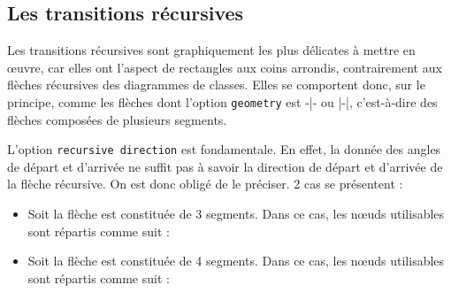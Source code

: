 \documentclass[a4paper,11pt]{report}
\newcommand{\inputTikZ}[1]{%
  }%
\newcommand{\inputTikZ}[1]{%
    \texttt{[image: fig/\#1.pdf]}%
  }%
\begin{document}
\subsection{Les transitions récursives}\label{s.rectrans}

Les transitions récursives sont graphiquement les plus délicates à mettre en \oe{}uvre, car elles ont l'aspect de rectangles aux coins arrondis, contrairement aux flèches récursives des diagrammes de classes. Elles se comportent donc, sur le principe, comme les flèches dont l'option {\tt geometry} est -|- ou |-|, c'est-à-dire des flèches composées de plusieurs segments.

\medskip

\begin{minipage}{0.51\textwidth}

\end{minipage}
\begin{minipage}{0.49\textwidth}
\begin{center}
\inputTikZ{figure56}
\end{center}
\end{minipage}

\medskip

L'option {\tt recursive direction} est fondamentale. En effet, la donnée des angles de départ et d'arrivée ne suffit pas à savoir la direction de départ et d'arrivée de la flèche récursive. On est donc obligé de le préciser. 2 cas se présentent :

\medskip

\begin{itemize}
\item Soit la flèche est constituée de 3 segments. Dans ce cas, les n\oe{}uds utilisables sont répartis comme suit :

\begin{center}
\inputTikZ{figure57}
\end{center}

\item Soit la flèche est constituée de 4 segments. Dans ce cas, les n\oe{}uds utilisables sont répartis comme suit :

\medskip

\begin{center}
\inputTikZ{figure58}
\end{center}

\vspace{-4cm}

\end{itemize}
\end{document}
